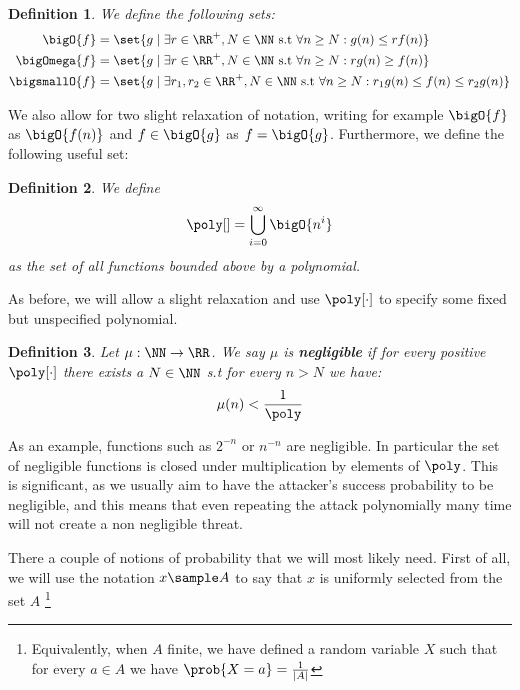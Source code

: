 \documentclass{article}
\newtheorem{definition}{Definition}
\begin{document}
\begin{definition} We define the following sets:
    \begin{align*}
        \bigO{f}      & = \set{ g \mid \exists r \in \RR^+, N \in \NN \text{ s.t } \forall n \geq N : g(n) \leq r f(n)  }                       \\
        \bigOmega{f}  & = \set{ g \mid \exists r \in \RR^+, N \in \NN \text{ s.t } \forall n \geq N : r g(n) \geq f(n)  }                       \\
        \bigsmallO{f} & = \set{ g \mid \exists r_1,r_2 \in \RR^+, N \in \NN \text{ s.t } \forall n \geq N : r_1 g(n) \leq f(n) \leq r_2 g(n)  }
    \end{align*}
\end{definition}
We also allow for two slight relaxation of notation, writing for example $\bigO{f}$ as $\bigO{f(n)}$ and $f \in \bigO{g}$ as $f = \bigO{g}$. Furthermore, we define the following useful set:
\begin{definition} We define
    \[\poly[] = \bigcup_{i = 0}^\infty \bigO{n^i}\]
    as the set of all functions bounded above by a polynomial.
\end{definition}
As before, we will allow a slight relaxation and use $\poly[\cdot]$ to specify some fixed but unspecified polynomial.

\begin{definition}
    Let $\mu : \NN \to \RR$. We say $\mu$ is \textbf{negligible} if for every positive $\poly[\cdot]$ there exists a $N \in \NN$ s.t for every $n > N$ we have:
    \[\mu(n) < \frac{1}{\poly}\]
\end{definition}
As an example, functions such as $2^{-n}$ or $n^{-n}$ are negligible. In particular the set of negligible functions is closed under multiplication by elements of $\poly$. This is significant, as we usually aim to have the attacker's success probability to be negligible, and this means that even repeating the attack polynomially many time will not create a non negligible threat. \par

There a couple of notions of probability that we will most likely need.
First of all, we will use the notation $x \sample A$ to say that $x$ is uniformly selected from the set $A$
\footnote{Equivalently, when $A$ finite, we have defined a random variable $X$ such that for every $a \in A$ we have  $\prob{X = a} = \frac{1}{|A|} $}
\end{document}
